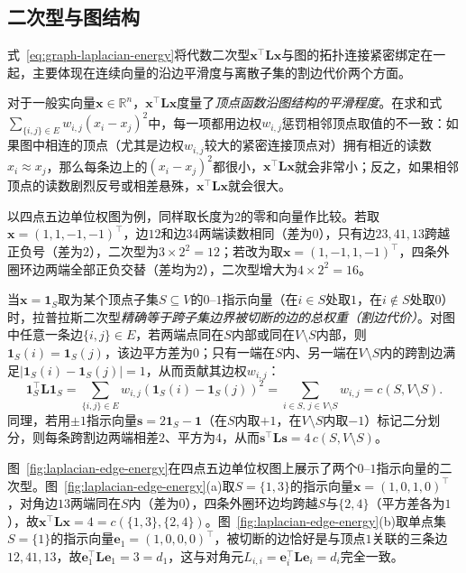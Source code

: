 \subsection{二次型与图结构}
\label{sec:graph-laplacian-cut-quadratic-form}

式~\eqref{eq:graph-laplacian-energy}将代数二次型$\bm x^\top\bm L\bm x$与图的拓扑连接紧密绑定在一起，主要体现在连续向量的沿边平滑度与离散子集的割边代价两个方面。

对于一般实向量$\bm x\in\mathbb R^n$，$\bm x^\top\bm L\bm x$度量了\emph{顶点函数沿图结构的平滑程度}。在求和式$\sum_{\{i,j\}\in E}w_{i,j}(x_i-x_j)^2$中，每一项都用边权$w_{i,j}$惩罚相邻顶点取值的不一致：如果图中相连的顶点（尤其是边权$w_{i,j}$较大的紧密连接顶点对）拥有相近的读数$x_i\approx x_j$，那么每条边上的$(x_i-x_j)^2$都很小，$\bm x^\top\bm L\bm x$就会非常小；反之，如果相邻顶点的读数剧烈反号或相差悬殊，$\bm x^\top\bm L\bm x$就会很大。

以四点五边单位权图为例，同样取长度为$2$的零和向量作比较。若取$\bm x=(1,1,-1,-1)^\top$，边$12$和边$34$两端读数相同（差为$0$），只有边$23,41,13$跨越正负号（差为$2$），二次型为$3\times 2^2=12$；若改为取$\bm x=(1,-1,1,-1)^\top$，四条外圈环边两端全部正负交替（差均为$2$），二次型增大为$4\times 2^2=16$。

当$\bm x=\bm 1_S$取为某个顶点子集$S\subseteq V$的$0$--$1$指示向量（在$i\in S$处取$1$，在$i\notin S$处取$0$）时，拉普拉斯二次型\emph{精确等于跨子集边界被切断的边的总权重（割边代价）}。对图中任意一条边$\{i,j\}\in E$，若两端点同在$S$内部或同在$V\setminus S$内部，则$\bm 1_S(i)=\bm 1_S(j)$，该边平方差为$0$；只有一端在$S$内、另一端在$V\setminus S$内的跨割边满足$|\bm 1_S(i)-\bm 1_S(j)|=1$，从而贡献其边权$w_{i,j}$：
\begin{equation}
  \bm 1_S^\top\bm L\bm 1_S
  =\sum_{\{i,j\}\in E}w_{i,j}(\bm 1_S(i)-\bm 1_S(j))^2
  =\sum_{i\in S,\,j\in V\setminus S}w_{i,j}
  =c(S,V\setminus S).
  \label{eq:graph-laplacian-cut-energy}
\end{equation}
同理，若用$\pm 1$指示向量$\bm s=2\bm 1_S-\bm 1$（在$S$内取$+1$，在$V\setminus S$内取$-1$）标记二分划分，则每条跨割边两端相差$2$、平方为$4$，从而$\bm s^\top\bm L\bm s=4\,c(S,V\setminus S)$。

图~\ref{fig:laplacian-edge-energy}在四点五边单位权图上展示了两个$0$--$1$指示向量的二次型。图~\ref{fig:laplacian-edge-energy}(a)取$S=\{1,3\}$的指示向量$\bm x=(1,0,1,0)^\top$，对角边$13$两端同在$S$内（差为$0$），四条外圈环边均跨越$S$与$\{2,4\}$（平方差各为$1$），故$\bm x^\top\bm L\bm x=4=c(\{1,3\},\{2,4\})$。图~\ref{fig:laplacian-edge-energy}(b)取单点集$S=\{1\}$的指示向量$\bm e_1=(1,0,0,0)^\top$，被切断的边恰好是与顶点$1$关联的三条边$12,41,13$，故$\bm e_1^\top\bm L\bm e_1=3=d_1$，这与对角元$L_{i,i}=\bm e_i^\top\bm L\bm e_i=d_i$完全一致。

